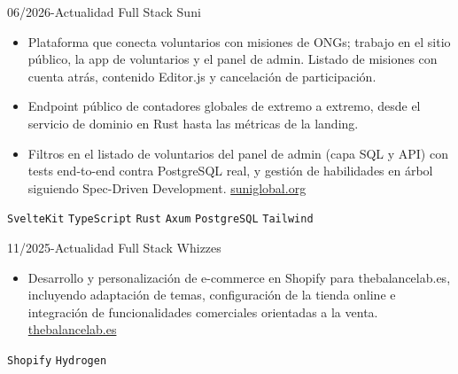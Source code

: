 \documentclass[9pt]{./src/developercv} %
\begin{document}
\vspace{4 pt}
\begin{entrylist}
	\entry
	{06/2026-Actualidad}
	{Full Stack}
	{Suni}
	{\vspace{-10pt}
		\begin{itemize}[noitemsep,topsep=0pt,parsep=0pt,partopsep=0pt, leftmargin=-1pt]
			\item {Plataforma que conecta voluntarios con misiones de ONGs; trabajo en el sitio público, la app de voluntarios y el panel de admin. Listado de misiones con cuenta atrás, contenido Editor.js y cancelación de participación.}
			\item {Endpoint público de contadores globales de extremo a extremo, desde el servicio de dominio en Rust hasta las métricas de la landing.}
			\item {Filtros en el listado de voluntarios del panel de admin (capa SQL y API) con tests end-to-end contra PostgreSQL real, y gestión de habilidades en árbol siguiendo Spec-Driven Development.}
			\href{https://suniglobal.org/}{suniglobal.org}
		\end{itemize}
		\texttt{SvelteKit} \slashsep \texttt{TypeScript} \slashsep \texttt{Rust} \slashsep \texttt{Axum} \slashsep \texttt{PostgreSQL} \slashsep \texttt{Tailwind}
	\vspace{2 pt}}
\end{entrylist}
\begin{entrylist}
	\entry
	{11/2025-Actualidad}
	{Full Stack}
	{Whizzes}
	{\vspace{-10pt}
		\begin{itemize}[noitemsep,topsep=0pt,parsep=0pt,partopsep=0pt, leftmargin=-1pt]
			\item {Desarrollo y personalización de e-commerce en Shopify para thebalancelab.es, incluyendo adaptación de temas, configuración de la tienda online e integración de funcionalidades comerciales orientadas a la venta.}
			\href{https://thebalancelab.es/}{thebalancelab.es}
		\end{itemize}
		\texttt{Shopify} \slashsep \texttt{Hydrogen}
	\vspace{2 pt}}
\end{entrylist}
\end{document}
